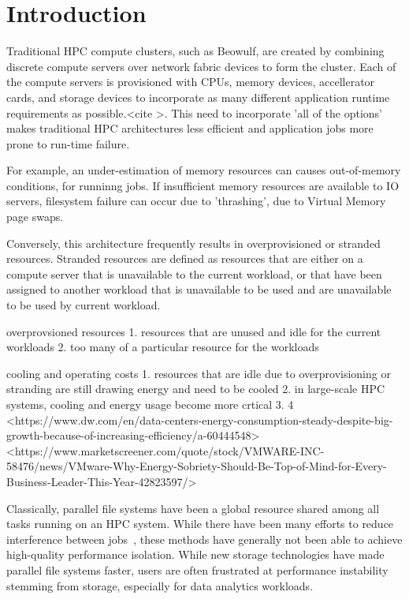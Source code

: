 \section{Introduction}

Traditional HPC compute clusters, such as Beowulf, are created by combining discrete compute servers over network fabric devices to form the cluster.  Each of the compute servers is provisioned with CPUs, memory devices, accellerator cards, and storage devices to incorporate as many different application runtime requirements as possible.<cite >. This need to incorporate 'all of the options' makes traditional HPC architectures less efficient and application jobs more prone to run-time failure.    

For example, an under-estimation of memory resources can causes out-of-memory conditions, for runninng jobs.  If insufficient memory resources are available to IO servers, filesystem failure can occur due to 'thrashing', due to Virtual Memory page swaps.

Conversely, this architecture frequently results in overprovisioned or stranded resources.  Stranded resources are defined as resources that are either on a compute server that is unavailable to the current workload, or that have been assigned to another workload that is unavailable to be used and are unavailable to be used by current workload.
 
 overprovsioned resources
  1.  resources that are unused and idle for the current workloads
  2.  too many of a particular resource for the workloads

cooling and operating costs
  1.  resources that are idle due to overprovisioning or stranding are still drawing energy and need to be cooled
  2.  in large-scale HPC systems, cooling and energy usage become more crtical 
  3.  4%
  <https://www.dw.com/en/data-centers-energy-consumption-steady-despite-big-growth-because-of-increasing-efficiency/a-60444548>
  <https://www.marketscreener.com/quote/stock/VMWARE-INC-58476/news/VMware-Why-Energy-Sobriety-Should-Be-Top-of-Mind-for-Every-Business-Leader-This-Year-42823597/>
  
Classically, parallel file systems have been a global resource shared among all tasks running on an HPC system. While there have been many efforts to reduce interference between jobs~\cite{10.1145/2063384.2063407,7573843}, these methods have generally not been able to achieve high-quality performance isolation. While new storage technologies have made parallel file systems faster, users are often frustrated at performance instability stemming from storage, especially for data analytics workloads.

